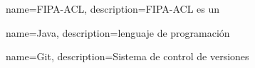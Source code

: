 {
    name=FIPA-ACL,
    description={FIPA-ACL es un}
}

{
    name=Java,
    description={lenguaje de programación}
}

{
    name=Git,
    description={Sistema de control de versiones}
}


